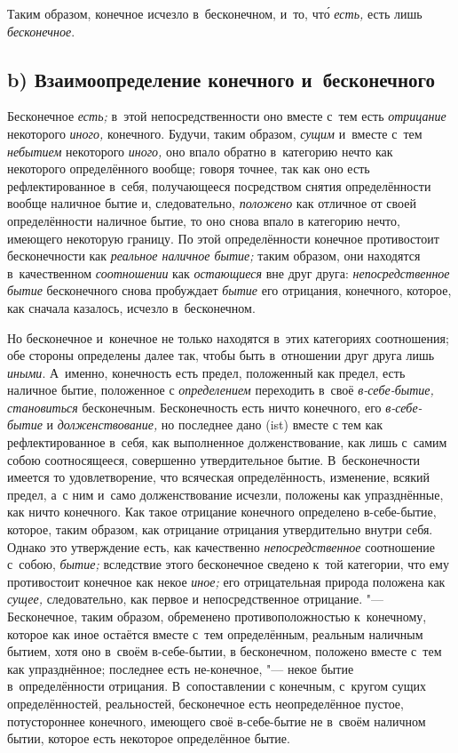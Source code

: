 Таким образом, конечное исчезло в~бесконечном,
и~то, чт\'{о} {\em есть,} есть лишь {\em бесконечное}.

\subsection[b) Взаимоопределение конечного и~бесконечного]%
{b) Взаимоопределение конечного и~бесконечного}

Бесконечное {\em есть;} в~этой непосредственности оно
вместе с~тем есть {\em отрицание} некоторого
{\em иного,} конечного. Будучи, таким образом,
{\em сущим} и~вместе с~тем {\em небытием} некоторого
{\em иного,} оно впало обратно в~категорию нечто как
некоторого определённого вообще; говоря точнее, так как оно есть
рефлектированное в~себя, получающееся посредством снятия определённости
вообще наличное бытие и, следовательно, {\em положено}
как отличное от своей определённости наличное бытие, то оно снова впало в
категорию нечто, имеющего некоторую границу. По этой определённости
конечное противостоит бесконечности как {\em реальное
наличное бытие;} таким образом, они находятся в~качественном
{\em соотношении} как
{\em остающиеся} вне друг друга:
{\em непосредственное бытие} бесконечного снова
пробуждает {\em бытие} его отрицания, конечного,
которое, как сначала казалось, исчезло в~бесконечном.

Но бесконечное и~конечное не только находятся в~этих категориях соотношения;
обе стороны определены далее так, чтобы быть в~отношении друг друга лишь
{\em иными}. А~именно, конечность есть предел,
положенный как предел, есть наличное бытие, положенное с
{\em определением} переходить в~своё
{\em в-себе-бытие,}
{\em становиться} бесконечным. Бесконечность есть ничто
конечного, его {\em в-себе-бытие} и
{\em долженствование,} но последнее дано (ist) вместе с
тем как рефлектированное в~себя, как выполненное долженствование, как лишь
с~самим собою соотносящееся, совершенно утвердительное бытие.
В~бесконечности имеется то удовлетворение, что всяческая определённость,
изменение, всякий предел, а~с ним и~само долженствование исчезли, положены
как упразднённые, как ничто конечного. Как такое отрицание конечного
определено в-себе-бытие, которое, таким образом, как отрицание отрицания
утвердительно внутри себя. Однако это утверждение есть, как качественно
{\em непосредственное} соотношение с~собою,
{\em бытие;} вследствие этого бесконечное сведено к~той
категории, что ему противостоит конечное как некое
{\em иное;} его отрицательная природа положена как
{\em сущее,} следовательно, как первое и
непосредственное отрицание. "--- Бесконечное, таким образом, обременено
противоположностью к~конечному, которое как иное остаётся вместе с~тем
определённым, реальным наличным бытием, хотя оно в~своём в-себе-бытии, в
бесконечном, положено вместе с~тем как упразднённое; последнее есть
не-конечное, "--- некое бытие в~определённости отрицания. В~сопоставлении с
конечным, с~кругом сущих определённостей, реальностей, бесконечное есть
неопределённое пустое, потустороннее конечного, имеющего своё в-себе-бытие
не в~своём наличном бытии, которое есть некоторое определённое бытие.

